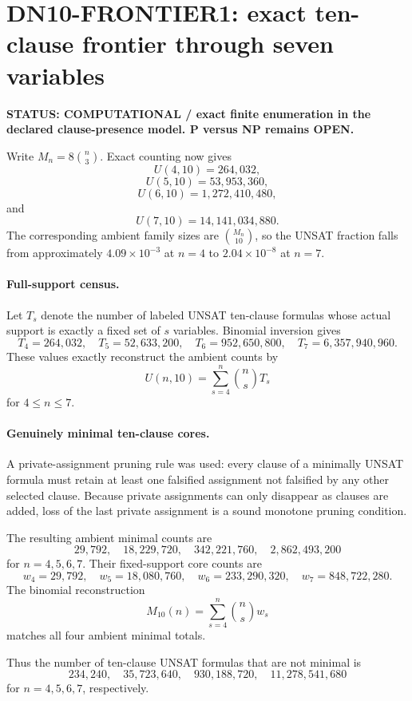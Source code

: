 \section*{DN10-FRONTIER1: exact ten-clause frontier through seven variables}

\textbf{STATUS: COMPUTATIONAL / exact finite enumeration in the declared clause-presence model. P versus NP remains OPEN.}

Write \(M_n=8\binom n3\). Exact counting now gives
\[
U(4,10)=264{,}032,
\]
\[
U(5,10)=53{,}953{,}360,
\]
\[
U(6,10)=1{,}272{,}410{,}480,
\]
and
\[
\boxed{U(7,10)=14{,}141{,}034{,}880}.
\]
The corresponding ambient family sizes are \(\binom{M_n}{10}\), so the UNSAT fraction falls from approximately \(4.09\times10^{-3}\) at \(n=4\) to \(2.04\times10^{-8}\) at \(n=7\).

\paragraph{Full-support census.}
Let \(T_s\) denote the number of labeled UNSAT ten-clause formulas whose actual support is exactly a fixed set of \(s\) variables. Binomial inversion gives
\[
\boxed{T_4=264{,}032,\quad
T_5=52{,}633{,}200,\quad
T_6=952{,}650{,}800,\quad
T_7=6{,}357{,}940{,}960.}
\]
These values exactly reconstruct the ambient counts by
\[
U(n,10)=\sum_{s=4}^{n}\binom nsT_s
\]
for \(4\le n\le7\).

\paragraph{Genuinely minimal ten-clause cores.}
A private-assignment pruning rule was used: every clause of a minimally UNSAT formula must retain at least one falsified assignment not falsified by any other selected clause. Because private assignments can only disappear as clauses are added, loss of the last private assignment is a sound monotone pruning condition.

The resulting ambient minimal counts are
\[
29{,}792,\quad
18{,}229{,}720,\quad
342{,}221{,}760,\quad
2{,}862{,}493{,}200
\]
for \(n=4,5,6,7\). Their fixed-support core counts are
\[
\boxed{w_4=29{,}792,\quad
w_5=18{,}080{,}760,\quad
w_6=233{,}290{,}320,\quad
w_7=848{,}722{,}280.}
\]
The binomial reconstruction
\[
M_{10}(n)=\sum_{s=4}^{n}\binom ns w_s
\]
matches all four ambient minimal totals.

Thus the number of ten-clause UNSAT formulas that are not minimal is
\[
234{,}240,\quad
35{,}723{,}640,\quad
930{,}188{,}720,\quad
11{,}278{,}541{,}680
\]
for \(n=4,5,6,7\), respectively.

